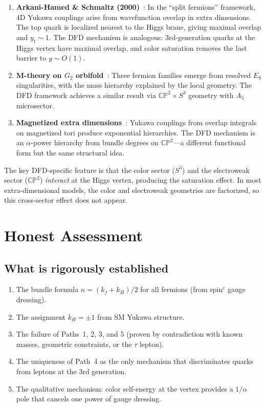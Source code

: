 \documentclass[11pt,a4paper]{article}
\newcommand{\CP}{\mathbb{CP}}
\theoremstyle{definition}
\theoremstyle{remark}
\begin{document}
\begin{enumerate}
\item \textbf{Arkani-Hamed \& Schmaltz (2000)}~\cite{ArkaniHamed1999}:
  In the ``split fermions'' framework, 4D Yukawa couplings arise from
  wavefunction overlap in extra dimensions.  The top quark is localized
  nearest to the Higgs brane, giving maximal overlap and $y_t \sim 1$.
  The DFD mechanism is analogous: 3rd-generation quarks at the Higgs vertex
  have maximal overlap, and color saturation removes the last barrier to
  $y \sim O(1)$.

\item \textbf{M-theory on $G_2$ orbifold}~\cite{Gonzalez2021}: Three
  fermion families emerge from resolved $E_8$ singularities, with the mass
  hierarchy explained by the local geometry.  The DFD framework achieves a
  similar result via $\CP^2 \times S^3$ geometry with $A_5$ microsector.

\item \textbf{Magnetized extra dimensions}~\cite{Cremades2004}: Yukawa
  couplings from overlap integrals on magnetized tori produce exponential
  hierarchies.  The DFD mechanism is an $\alpha$-power hierarchy from
  bundle degrees on $\CP^2$---a different functional form but the same
  structural idea.
\end{enumerate}

The key DFD-specific feature is that the color sector ($S^3$) and the
electroweak sector ($\CP^2$) \emph{interact} at the Higgs vertex, producing
the saturation effect.  In most extra-dimensional models, the color and
electroweak geometries are factorized, so this cross-sector effect does not
appear.

\section{Honest Assessment}
\label{sec:honest}

\subsection{What is rigorously established}

\begin{enumerate}
\item The bundle formula $n = (k_f + k_H)/2$ for all fermions
  (from spin$^c$ gauge dressing).
\item The assignment $k_H = \pm 1$ from SM Yukawa structure.
\item The failure of Paths~1, 2, 3, and 5 (proven by contradiction with
  known masses, geometric constraints, or the $\tau$ lepton).
\item The uniqueness of Path~4 as the only mechanism that discriminates
  quarks from leptons at the 3rd generation.
\item The qualitative mechanism: color self-energy at the vertex provides
  a $1/\alpha$ pole that cancels one power of gauge dressing.
\end{enumerate}
\end{document}
